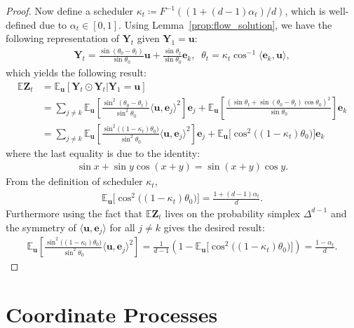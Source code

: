 \begin{proof}
Now define a scheduler $\kappa_t\coloneqq F^{-1}((1 + (d-1)\alpha_t)/d)$, which is well-defined due to $\alpha_t\in[0,1]$.
Using Lemma~\ref{prop:flow_solution}, we have the following representation of $\bm{Y}_t$ given $\bm{Y}_1=\bm{u}$:
\begin{align}
    \bm{Y}_t 
    =\frac{\sin(\theta_0-\theta_t)}{\sin\theta_0}\bm{u} + \frac{\sin\theta_t}{\sin\theta_0}\bm{e}_k, \;\; \theta_t = \kappa_t \cos^{-1}\langle \bm{e}_k, \bm{u} \rangle,
\label{eq:uniform_flow_as_theta}
\end{align}
which yields the following result:
\begin{align}
    \mathbb{E}\bm{Z}_t 
    &= \mathbb{E}_{\bm{u}} \left[ \bm{Y}_t\odot\bm{Y}_t | \bm{Y}_1=\bm{u}\right] \\
    &= \sum_{j\neq k}\mathbb{E}_{\bm{u}}\left[ \frac{\sin^2(\theta_0 - \theta_t)}{\sin^2\theta_0}\langle \bm{u},\bm{e}_j \rangle^2 \right] \bm{e}_j 
    + \mathbb{E}_{\bm{u}}\left[\frac{(\sin\theta_t + \sin(\theta_0-\theta_t)\cos\theta_0)^2}{\sin\theta_0}\right]\bm{e}_k \\
    &= \sum_{j\neq k}\mathbb{E}_{\bm{u}}\left[ \frac{\sin^2\big((1-\kappa_t)\theta_0\big)}{\sin^2\theta_0}\langle \bm{u},\bm{e}_j \rangle^2 \right] \bm{e}_j 
    + \mathbb{E}_{\bm{u}}\Big[ \cos^2\big((1-\kappa_t)\theta_0 \big) \Big] \bm{e}_k
\end{align}
where the last equality is due to the identity:
\begin{align}
    \sin x + \sin y\cos(x+y) = \sin(x+y)\cos y.
\end{align}
From the definition of scheduler $\kappa_t$, 
\begin{align}
    \mathbb{E}_{\bm{u}}\Big[ \cos^2\big((1-\kappa_t)\theta_0 \big) \Big] 
    = \frac{1+(d-1)\alpha_t}{d}.
\end{align}
Furthermore using the fact that $\mathbb{E}\bm{Z}_t$ lives on the probability simplex $\Delta^{d-1}$ and the symmetry of $\langle \bm{u}, \bm{e}_j\rangle$ for all $j\neq k$ gives the desired result:
\begin{align}
    \mathbb{E}_{\bm{u}}\left[ \frac{\sin^2\big((1-\kappa_t)\theta_0\big)}{\sin^2\theta_0}\langle \bm{u},\bm{e}_j \rangle^2 \right] 
    = \frac{1}{d-1} \left( 1 - \mathbb{E}_{\bm{u}}\Big[ \cos^2\big((1-\kappa_t)\theta_0 \big) \Big] \right)
    = \frac{1-\alpha_t}{d} .
\end{align}
\end{proof}



\section{Coordinate Processes}

